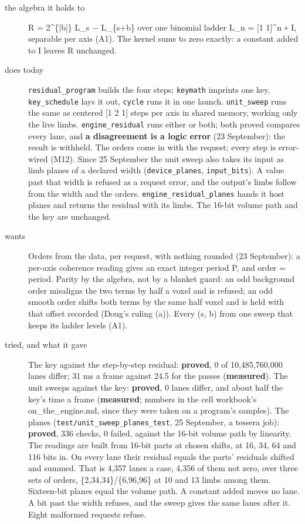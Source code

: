 \begin{description}
\item[{the algebra it holds to}] R = 2\textasciicircum{}\{|b|\} L\_\allowbreak{}s − L\_\allowbreak{}\{s+b\} over one binomial ladder L\_\allowbreak{}n = [1 1]\textasciicircum{}n ∗ I, separable per axis (A1). The kernel sums to zero exactly: a constant added to I leaves R unchanged.
\item[{does today}] \texttt{residual\_\allowbreak{}program} builds the four steps; \texttt{keymath} imprints one key, \texttt{key\_\allowbreak{}schedule} lays it out, \texttt{cycle} runs it in one launch. \texttt{unit\_\allowbreak{}sweep} runs the same as centered [1 2 1] steps per axis in shared memory, working only the live limbs. \texttt{engine\_\allowbreak{}residual} runs either or both; both proved compares every lane, and \textbf{a disagreement is a logic error} (23 September): the result is withheld. The orders come in with the request; every step is error-wired (M12). Since 25 September the unit sweep also takes its input as limb planes of a declared width (\texttt{device\_\allowbreak{}planes}, \texttt{input\_\allowbreak{}bits}). A value past that width is refused as a request error, and the output's limbs follow from the width and the orders. \texttt{engine\_\allowbreak{}residual\_\allowbreak{}planes} hands it host planes and returns the residual with its limbs. The 16-bit volume path and the key are unchanged.
\item[{wants}] Orders from the data, per request, with nothing rounded (23 September): a per-axis coherence reading gives an exact integer period P, and order = period. Parity by the algebra, not by a blanket guard: an odd background order misaligns the two terms by half a voxel and is refused; an odd smooth order shifts both terms by the same half voxel and is held with that offset recorded (Doug's ruling (a)). Every (s, b) from one sweep that keeps its ladder levels (A1).
\item[{tried, and what it gave}] The key against the step-by-step residual: \textbf{proved}, 0 of 10,485,760,000 lanes differ; 31 ms a frame against 24.5 for the passes (\textbf{measured}). The unit sweeps against the key: \textbf{proved}, 0 lanes differ, and about half the key's time a frame (\textbf{measured}; numbers in the cell workbook's on\_\allowbreak{}the\_\allowbreak{}engine.md, since they were taken on a program's samples). The planes (\texttt{test/\allowbreak{}unit\_\allowbreak{}sweep\_\allowbreak{}planes\_\allowbreak{}test}, 25 September, a tessera job): \textbf{proved}, 336 checks, 0 failed, against the 16-bit volume path by linearity. The readings are built from 16-bit parts at chosen shifts, at 16, 34, 64 and 116 bits in. On every lane their residual equals the parts' residuals shifted and summed. That is 4,357 lanes a case, 4,356 of them not zero, over three sets of orders, \{2,34,34\}/\{6,96,96\} at 10 and 13 limbs among them. Sixteen-bit planes equal the volume path. A constant added moves no lane. A bit past the width refuses, and the sweep gives the same lanes after it. Eight malformed requests refuse.

\end{description}
